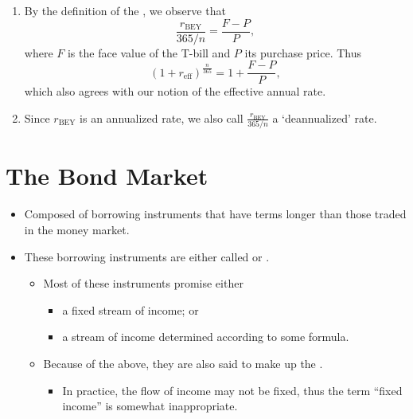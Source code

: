 \documentclass[notoc,notitlepage]{tufte-book}
\DeclareMathOperator{\BEY}{BEY}
\DeclareMathOperator{\eff}{eff}
\begin{document}
\begin{remark}
  \begin{enumerate}
    \item By the definition of the ,
      we observe that
      \begin{equation*}
        \frac{r_{\BEY}}{365 / n} = \frac{F - P}{P},
      \end{equation*}
      where $F$ is the face value of the T-bill and $P$ its purchase price.
      Thus
      \begin{equation*}
        (1 + r_{\eff})^{\frac{n}{365}} = 1 + \frac{F - P}{P},
      \end{equation*}
      which also agrees with our notion of the effective annual rate.
    \item Since $r_{\BEY}$ is an annualized rate, we also call
      $\frac{r_{\BEY}}{365 / n}$ a `deannualized' rate.
  \end{enumerate}
\end{remark}



\section{The Bond Market}%
\label{sec:the_bond_market}

\begin{itemize}
  \item Composed of borrowing instruments that have terms longer than those
    traded in the money market.
  \item These borrowing instruments are either called 
    or .
    \begin{itemize}
      \item Most of these instruments promise either
        \begin{itemize}
          \item a fixed stream of income; or
          \item a stream of income determined according to some formula.
        \end{itemize}
      \item Because of the above, they are also said
        to make up the .
        \begin{itemize}
          \item In practice, the flow of income may not be fixed,
            thus the term ``fixed income'' is somewhat inappropriate.
        \end{itemize}
    \end{itemize}
\end{itemize}
\end{document}
